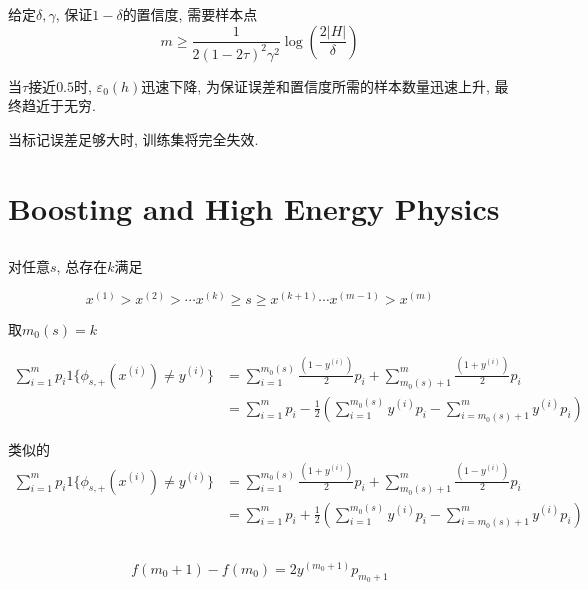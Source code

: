 \documentclass{ctexart}
\begin{document}
给定$\delta, \gamma$, 保证$1- \delta$的置信度, 需要样本点
\begin{equation}
	m \ge \frac{1}{2(1-2\tau)^2\gamma^2}\log(\frac{2|H|}{\delta})
\end{equation}

当$\tau$接近$0.5$时, $\varepsilon_0(h)$迅速下降, 为保证误差和置信度所需的样本数量迅速上升, 最终趋近于无穷.

当标记误差足够大时, 训练集将完全失效.

\section{Boosting and High Energy Physics}

\subsection{}
对任意$s$, 总存在$k$满足

\begin{equation}
	x^{(1)} > x^{(2)} > \cdots x^{(k)} \ge s \ge x^{(k+1)} \cdots x^{(m-1)} > x^{(m)}
\end{equation}

取$m_0(s) = k$

\begin{align*}
	\sum_{i=1}^m p_i 1 \{\phi_{s,+}(x^{(i)}) \ne y^{(i)} \} &= \sum_{i=1}^{m_0(s)}\frac{(1 - y^{(i)})}{2}p_i + \sum_{m_0(s) + 1}^m\frac{(1 + y^{(i)})}{2}p_i \\
	&= \sum_{i=1}^m p_i - \frac{1}{2}(\sum_{i=1}^{m_0(s)} y^{(i)}p_i - \sum_{i = m_0(s) + 1}^m y^{(i)} p_i)
\end{align*}

类似的
\begin{align*}
\sum_{i=1}^m p_i 1 \{\phi_{s,+}(x^{(i)}) \ne y^{(i)} \} &= \sum_{i=1}^{m_0(s)}\frac{(1 + y^{(i)})}{2}p_i + \sum_{m_0(s) + 1}^m\frac{(1 - y^{(i)})}{2}p_i \\
&= \sum_{i=1}^m p_i + \frac{1}{2}(\sum_{i=1}^{m_0(s)} y^{(i)}p_i - \sum_{i = m_0(s) + 1}^m y^{(i)} p_i)
\end{align*}

\subsection{}

\begin{equation}
	f(m_0 + 1) - f(m_0) = 2y^{(m_0 + 1)}p_{m_0 + 1}
\end{equation}
\end{document}
